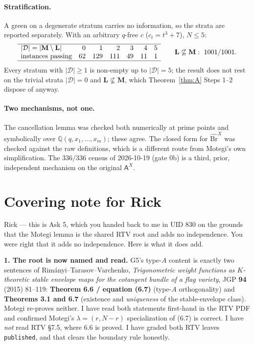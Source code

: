 \documentclass[11pt]{article}
\theoremstyle{plain}
\theoremstyle{definition}
\theoremstyle{remark}
\newcommand{\bM}{\mathbf M}
\newcommand{\bL}{\mathbf L}
\newcommand{\cD}{\mathcal D}
\newcommand{\Bh}{\widehat{\mathrm{Br}}}
\begin{document}
\paragraph{Stratification.}
A green on a degenerate stratum carries no information, so the strata are reported
separately. With an arbitrary $q$-free $c$ ($c_t=t^3+7$), $N\le5$:
\[
\begin{array}{lrrrrrr}
\hline
|\cD|=|\bM\setminus\bL| & 0 & 1 & 2 & 3 & 4 & 5\\
\text{instances passing} & 62 & 129 & 111 & 49 & 11 & 1\\
\hline
\end{array}
\qquad
\bL\not\subseteq\bM:\ 1001/1001.
\]
Every stratum with $|\cD|\ge1$ is non-empty up to $|\cD|=5$; the result does not
rest on the trivial strata $|\cD|=0$ and $\bL\not\subseteq\bM$, which
Theorem~\ref{thm:A} Steps 1--2 dispose of anyway.

\paragraph{Two mechanisms, not one.}
The cancellation lemma was checked both numerically at prime points and
symbolically over $\mathbb Q(q,x_1,\dots,x_m)$; these agree. The closed form for
$\Bh^X$ was checked against the raw definitions, which is a different route from
Motegi's own simplification. The $336/336$ census of 2026-10-19 (gate 0b) is a
third, prior, independent mechanism on the original $\mathsf A^X$.

\section{Covering note for Rick}
\label{sec:note}

Rick --- this is Ask 5, which you handed back to me in UID 830 on the grounds that
the Motegi lemma is the shared RTV root and adds no independence. You were right
that it adds no independence. Here is what it does add.

\textbf{1. The root is now named and read.} G5's type-$A$ content is exactly two
sentences of Rim\'anyi--Tarasov--Varchenko, \emph{Trigonometric weight functions as
$K$-theoretic stable envelope maps for the cotangent bundle of a flag variety},
JGP \textbf{94} (2015) 81--119: \textbf{Theorem 6.6 / equation (6.7)} (type-$A$
orthogonality) and \textbf{Theorems 3.1 and 6.7} (existence and \emph{uniqueness}
of the stable-envelope class). Motegi re-proves neither. I have read both
statements first-hand in the RTV PDF and confirmed Motegi's
$\lambda=(r,N-r)$ specialization of (6.7) is correct. I have \emph{not} read RTV
\S7.5, where 6.6 is proved. I have graded both RTV leaves \texttt{published},
and that clears the boundary rule honestly.
\end{document}
